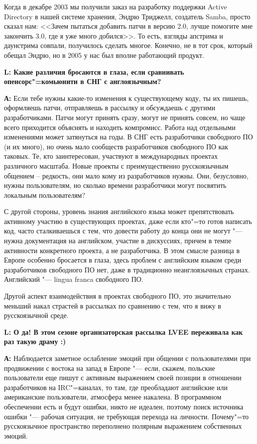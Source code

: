 \documentclass[10pt, a5paper]{article}
\begin{document}
Когда в декабре 2003 мы получили заказ на разработку поддержки Active Directory
в нашей системе хранения, Эндрю Триджелл, создатель Samba, просто сказал нам:
<<Зачем пытаться добавить патчи в версию 2.0, лучше помогите мне закончить 3.0,
где я уже много добился>>. То есть, взгляды апстрима и даунстрима совпали,
получилось сделать многое. Конечно, не в тот срок, который обещал Эндрю, но в
2005 у нас был вполне работающий продукт.

{\noindent \bf L: Какие различия бросаются в глаза, если сравнивать опенсорс"=комьюнити в СНГ с англоязычным? }

{\noindent \bf А:} Если тебе нужны какие-то изменения к существующему коду, ты их пишешь,
оформляешь патчи, отправляешь в рассылку и обсуждаешь с другими разработчиками.
Патчи могут принять сразу, могут не принять совсем, но чаще всего приходится
объяснять и находить компромисс. Работа над отдельными изменениями может
затянуться на годы. В СНГ есть разработчики свободного ПО (и их много), но
очень мало сообществ разработчиков свободного ПО как таковых. Те, кто
заинтересован, участвуют в международных проектах различного масштаба. Новые
проекты с преимущественно русскоязычным общением -- редкость, они мало кому из
разработчиков нужны. Они, безусловно, нужны пользователям, но сколько времени
разработчики могут посвятить локальным пользователям?

С другой стороны, уровень знания английского языка может препятствовать
активному участию в существующих проектах, даже если кто"=то готов написать
код, часто сталкиваешься с тем, что довести работу до конца они не могут "---
нужна документация на английском, участие в дискуссиях, причем в темпе
активности конкретного проекта, а не разработчика.  В этом смысле разница в
Европе особенно бросается в глаза, здесь проблем с английским языком среди
разработчиков свободного ПО нет, даже в традиционно неанглоязычных странах.
Английский "--- lingua franca свободного ПО.

Другой аспект взаимодействия в проектах свободного ПО, это значительно меньший
накал страстей в рассылках по сравнению с тем, что я вижу в русскоязычной
среде. 

{\noindent \bf L: О да! В этом сезоне организаторская рассылка LVEE переживала 
как раз такую драму :) }

{\noindent \bf А:} Наблюдается заметное ослабление эмоций при общении с пользователями при
продвижении с востока на запад в Европе "--- если, скажем, польские пользователи
еще пишут с активным выражением своей позиции в отношении разработчиков на IRC"=каналах, 
то там, где преобладают английские или американские пользователи,
атмосфера менее накалена. В программном обеспечении есть и будут ошибки, никто
не идеален, поэтому поиск источника ошибки "--- рабочая ситуация, не требующая
перехода на личности. Почему"=то русскоязычное пространство переполнено полярным
выражением собственных эмоций.
\end{document}
